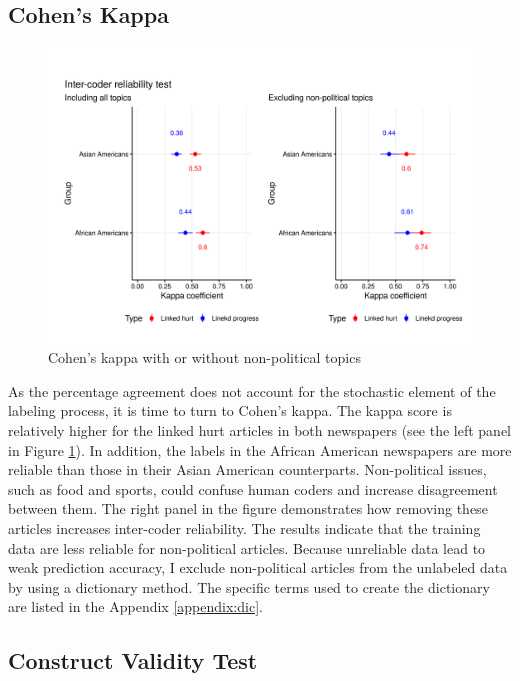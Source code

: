 \documentclass[12 pt]{article}
\begin{document}
\subsection{Cohen's Kappa}

\begin{figure}[htbp!]
    \centering
    \includegraphics[width=0.9\linewidth]{content_analysis_kappa_comp.png}
    \caption{Cohen's kappa with or without non-political topics}
    \label{fig:cohen_kappa_comp}
\end{figure}

As the percentage agreement does not account for the stochastic element of the labeling process, it is time to turn to Cohen's kappa. The kappa score is relatively higher for the linked hurt articles in both newspapers (see the left panel in Figure \ref{fig:cohen_kappa_comp}). In addition, the labels in the African American newspapers are more reliable than those in their Asian American counterparts. Non-political issues, such as food and sports, could confuse human coders and increase disagreement between them. The right panel in the figure demonstrates how removing these articles increases inter-coder reliability. The results indicate that the training data are less reliable for non-political articles. Because unreliable data lead to weak prediction accuracy, I exclude non-political articles from the unlabeled data by using a dictionary method. The specific terms used to create the dictionary are listed in the Appendix \ref{appendix:dic}. 

\subsection{Construct Validity Test}
\end{document}
